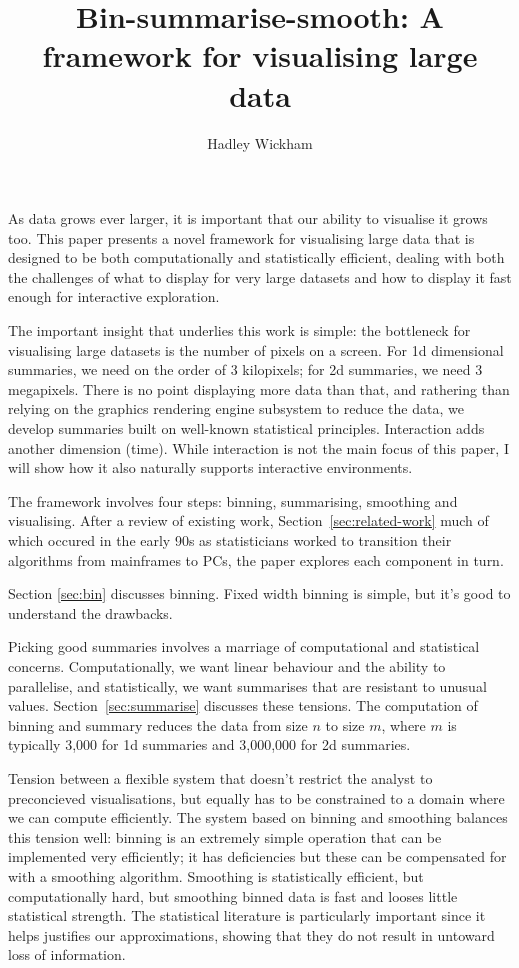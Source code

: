 \documentclass[journal]{vgtc}                %
\title{Bin-summarise-smooth: A framework for visualising large data}
\author{Hadley Wickham}
\begin{document}

\maketitle

As data grows ever larger, it is important that our ability to visualise it grows too. This paper presents a novel framework for visualising large data that is designed to be both computationally and statistically efficient, dealing with both the challenges of what to display for very large datasets and how to display it fast enough for interactive exploration.

The important insight that underlies this work is simple: the bottleneck for visualising large datasets is the number of pixels on a screen. For 1d dimensional summaries, we need on the order of 3 kilopixels; for 2d summaries, we need 3 megapixels.  There is no point displaying more data than that, and rathering than relying on the graphics rendering engine subsystem to reduce the data, we develop summaries built on well-known statistical principles. Interaction adds another dimension (time). While interaction is not the main focus of this paper, I will show how it also naturally supports interactive environments.

The framework involves four steps: binning, summarising, smoothing and visualising. After a review of existing work, Section~\ref{sec:related-work} much of which occured in the early 90s as statisticians worked to transition their algorithms from mainframes to PCs, the paper explores each component in turn.

Section \ref{sec:bin} discusses binning. Fixed width binning is simple, but it's good to understand the drawbacks.

Picking good summaries involves a marriage of computational and statistical  concerns. Computationally, we want linear behaviour and the ability to parallelise, and statistically, we want summarises that are resistant to unusual values. Section~\ref{sec:summarise} discusses these tensions.  The computation of binning and summary reduces the data from size $n$ to size $m$, where $m$ is typically 3,000 for 1d summaries and 3,000,000 for 2d summaries.

Tension between a flexible system that doesn't restrict the analyst to preconcieved visualisations, but equally has to be constrained to a domain where we can compute efficiently. The system based on binning and smoothing balances this tension well: binning is an extremely simple operation that can be implemented very efficiently; it has deficiencies but these can be compensated for with a smoothing algorithm. Smoothing is statistically efficient, but computationally hard, but smoothing binned data is fast and looses little statistical strength. The statistical literature is particularly important since it helps justifies our approximations, showing that they do not result in untoward loss of information.
\end{document}
